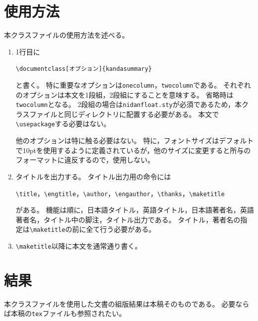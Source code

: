 \documentclass{kandasummary}
\begin{document}
\section{使用方法}
本クラスファイルの使用方法を述べる。

\begin{enumerate}
\item 1行目に
\begin{flushleft}
\verb|\documentclass[オプション]{kandasummary}|
\end{flushleft}
と書く。
特に重要なオプションは\texttt{onecolumn}，\texttt{twocolumn}である。
それぞれのオプションは本文を1段組，2段組にすることを意味する。
省略時は\texttt{twocolumn}となる。
2段組の場合は\texttt{nidanfloat.sty}が必須であるため，本クラスファイルと同じディレクトリに配置する必要がある。
本文で\verb|\usepackage|する必要はない。

他のオプションは特に触る必要はない。
特に，フォントサイズはデフォルトで10ptを使用するように定義されているが，他のサイズに変更すると所与のフォーマットに違反するので，使用しない。

\item タイトルを出力する。
タイトル出力用の命令には
\begin{flushleft}
\verb|\title|，\verb|\engtitle|，\verb|\author|，\verb|\engauthor|，\verb|\thanks|，\verb|\maketitle|
\end{flushleft}
がある。
機能は順に，日本語タイトル，英語タイトル，日本語著者名，英語著者名，タイトル中の脚注，タイトル出力である。
タイトル，著者名の指定は\verb|\maketitle|の前に全て行う必要がある。

\item \verb|\maketitle|以降に本文を通常通り書く。
\end{enumerate}


\section{結果}
本クラスファイルを使用した文書の組版結果は本稿そのものである。
必要ならば本稿の\texttt{tex}ファイルも参照されたい。
\end{document}
